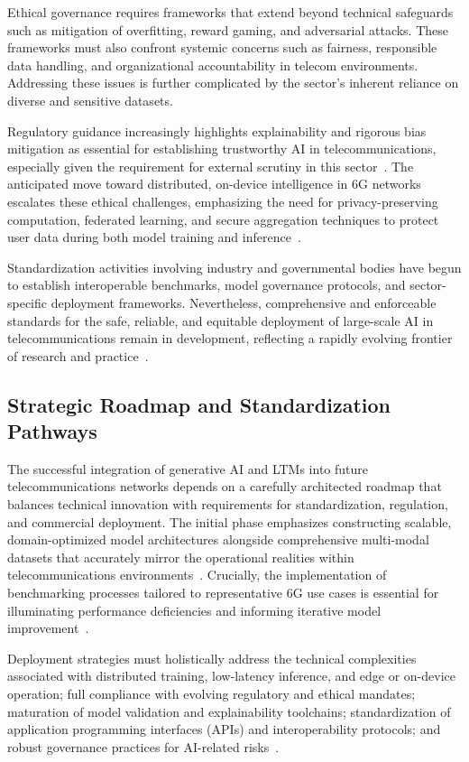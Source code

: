 \documentclass[sigconf]{acmart}
\begin{document}
Ethical governance requires frameworks that extend beyond technical safeguards such as mitigation of overfitting, reward gaming, and adversarial attacks. These frameworks must also confront systemic concerns such as fairness, responsible data handling, and organizational accountability in telecom environments. Addressing these issues is further complicated by the sector's inherent reliance on diverse and sensitive datasets.

Regulatory guidance increasingly highlights explainability and rigorous bias mitigation as essential for establishing trustworthy AI in telecommunications, especially given the requirement for external scrutiny in this sector~\cite{ref49}. The anticipated move toward distributed, on-device intelligence in 6G networks escalates these ethical challenges, emphasizing the need for privacy-preserving computation, federated learning, and secure aggregation techniques to protect user data during both model training and inference~\cite{ref44,ref49}.

Standardization activities involving industry and governmental bodies have begun to establish interoperable benchmarks, model governance protocols, and sector-specific deployment frameworks. Nevertheless, comprehensive and enforceable standards for the safe, reliable, and equitable deployment of large-scale AI in telecommunications remain in development, reflecting a rapidly evolving frontier of research and practice~\cite{ref49}.

\subsection{Strategic Roadmap and Standardization Pathways}

The successful integration of generative AI and LTMs into future telecommunications networks depends on a carefully architected roadmap that balances technical innovation with requirements for standardization, regulation, and commercial deployment. The initial phase emphasizes constructing scalable, domain-optimized model architectures alongside comprehensive multi-modal datasets that accurately mirror the operational realities within telecommunications environments~\cite{ref33}. Crucially, the implementation of benchmarking processes tailored to representative 6G use cases is essential for illuminating performance deficiencies and informing iterative model improvement~\cite{ref33,ref46}.

Deployment strategies must holistically address the technical complexities associated with distributed training, low-latency inference, and edge or on-device operation; full compliance with evolving regulatory and ethical mandates; maturation of model validation and explainability toolchains; standardization of application programming interfaces (APIs) and interoperability protocols; and robust governance practices for AI-related risks~\cite{ref46,ref49}.
\end{document}
